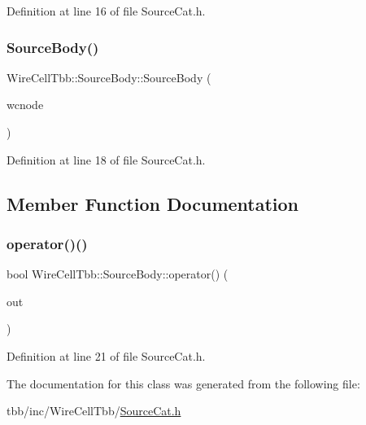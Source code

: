 Definition at line 16 of file Source\+Cat.\+h.

\mbox{\label{class_wire_cell_tbb_1_1_source_body_a107fb76f3d6dd94760017055e96654a1}} 
\subsubsection{\texorpdfstring{Source\+Body()}{SourceBody()}}
{\footnotesize\ttfamily Wire\+Cell\+Tbb\+::\+Source\+Body\+::\+Source\+Body (\begin{DoxyParamCaption}\item[{\hyperlink{class_wire_cell_1_1_interface_a09c548fb8266cfa39afb2e74a4615c37}{Wire\+Cell\+::\+I\+Node\+::pointer}}]{wcnode }\end{DoxyParamCaption})\hspace{0.3cm}{\ttfamily [inline]}}



Definition at line 18 of file Source\+Cat.\+h.



\subsection{Member Function Documentation}
\mbox{\label{class_wire_cell_tbb_1_1_source_body_a3b6306055f1df5349bc6e23c55c397b9}} 
\subsubsection{\texorpdfstring{operator()()}{operator()()}}
{\footnotesize\ttfamily bool Wire\+Cell\+Tbb\+::\+Source\+Body\+::operator() (\begin{DoxyParamCaption}\item[{boost\+::any \&}]{out }\end{DoxyParamCaption})\hspace{0.3cm}{\ttfamily [inline]}}



Definition at line 21 of file Source\+Cat.\+h.



The documentation for this class was generated from the following file\+:\begin{DoxyCompactItemize}
\item 
tbb/inc/\+Wire\+Cell\+Tbb/\hyperlink{_source_cat_8h}{Source\+Cat.\+h}\end{DoxyCompactItemize}
